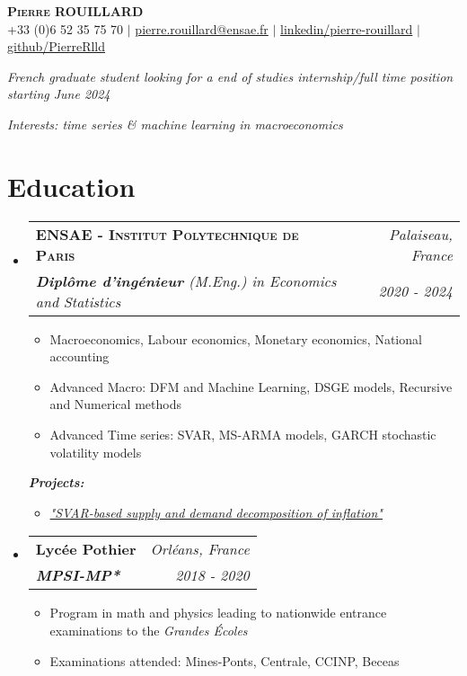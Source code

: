 \documentclass[letterpaper,10pt]{article}
\makeatletter
\newcommand{\resumeItem}[1]{
    \item\small{
            {#1 \vspace{-2pt}}
    }
}
\newcommand{\resumeSubheading}[4]{
    \vspace{-2pt}\item
    \begin{tabular*}{0.97\textwidth}[t]{l@{\extracolsep{\fill}}r}
        \textbf{#1}       & #2                 \\
        \textit{\small#3} & \textit{\small #4} \\
    \end{tabular*}\vspace{-7pt}
}
\newcommand{\resumeSubHeadingListStart}{\begin{itemize}[leftmargin=0.15in, label={}]}
\newcommand{\resumeSubHeadingListEnd}{\end{itemize}}
\newcommand{\resumeItemListStart}{\begin{itemize}}
\newcommand{\resumeItemListEnd}{\end{itemize}\vspace{-5pt}}
\makeatother
\begin{document}
\begin{center}
{\Large\textsc{\textbf{Pierre ROUILLARD}}} \\ \vspace{2pt}
\small +33 (0)6 52 35 75 70 $|$ \href{mailto:pierre.rouillard@ensae.fr}{pierre.rouillard@ensae.fr} $|$
\href{https://www.linkedin.com/in/pierre-rouillard/}{linkedin/pierre-rouillard} $|$
\href{https://github.com/PierreRlld}{github/PierreRlld}\\
\vspace{.1cm}
\end{center}

\begin{center}
    \textit{French graduate student looking for a end of studies internship/full time position starting June 2024}\par
    \textit{Interests: time series \& machine learning in macroeconomics}
\end{center}

\section{Education}
\resumeSubHeadingListStart
\resumeSubheading
{\textsc{ENSAE - Institut Polytechnique de Paris}}{\textit{\small{Palaiseau, France}}}{\textbf{Diplôme d'ingénieur} (M.Eng.) in Economics and Statistics}{2020 - 2024}
\resumeItemListStart
\resumeItem{Macroeconomics, Labour economics, Monetary economics, National accounting}
\resumeItem{Advanced Macro: DFM and Machine Learning, DSGE models, Recursive and Numerical methods}
\resumeItem{Advanced Time series: SVAR, MS-ARMA models, GARCH stochastic volatility models}
\resumeItemListEnd
\quad \small{\textit{\textbf{Projects:}}}\vspace{-.2cm}
\resumeItemListStart
\resumeItem{\textcolor{blue(pigment)}{\textit{\href{https://github.com/PierreRlld/SVAR3A}{"SVAR-based supply and demand decomposition of inflation"}}}}
\resumeItemListEnd
\vspace{.1cm}
\resumeSubheading{Lycée Pothier}{\textit{\small{Orléans, France}}}
{\textbf{MPSI-MP*}}{2018 - 2020}
\resumeItemListStart
\resumeItem{Program in math and physics leading to nationwide entrance examinations to the \textit{Grandes Écoles}}
\resumeItem{Examinations attended: Mines-Ponts, Centrale, CCINP, Beceas}
\resumeItemListEnd
\resumeSubHeadingListEnd
\vspace{0cm}
\end{document}
